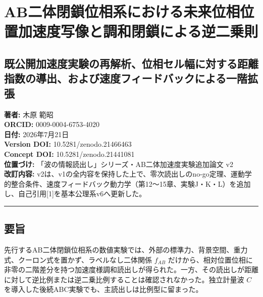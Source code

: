\documentclass[
  a4paper,
]{ltjsarticle}
\author{}
\date{}
\begin{document}
\section{AB二体閉鎖位相系における未来位相位置加速度写像と調和閉鎖による逆二乗則}\label{abux4e8cux4f53ux9589ux9396ux4f4dux76f8ux7cfbux306bux304aux3051ux308bux672aux6765ux4f4dux76f8ux4f4dux7f6eux52a0ux901fux5ea6ux5199ux50cfux3068ux8abfux548cux9589ux9396ux306bux3088ux308bux9006ux4e8cux4e57ux5247}

\subsection{既公開加速度実験の再解析、位相セル幅に対する距離指数の導出、および速度フィードバックによる一階拡張}\label{ux65e2ux516cux958bux52a0ux901fux5ea6ux5b9fux9a13ux306eux518dux89e3ux6790ux4f4dux76f8ux30bbux30ebux5e45ux306bux5bfeux3059ux308bux8dddux96e2ux6307ux6570ux306eux5c0eux51faux304aux3088ux3073ux901fux5ea6ux30d5ux30a3ux30fcux30c9ux30d0ux30c3ux30afux306bux3088ux308bux4e00ux968eux62e1ux5f35}

\textbf{著者:} 木原 範昭\\
\textbf{ORCID:} 0009-0004-6753-4020\\
\textbf{日付:} 2026年7月21日\\
\textbf{Version DOI:} 10.5281/zenodo.21466463\\
\textbf{Concept DOI:} 10.5281/zenodo.21441081\\
\textbf{位置づけ:} 「波の情報読出し」シリーズ・AB二体加速度実験追加論文
v2\\
\textbf{改訂内容:}
v2は、v1の全内容を保持した上で、零次読出しのno-go定理、運動学的整合条件、速度フィードバック動力学（第12〜15章、実験J・K・L）を追加し、自己引用{[}1{]}を基本公理系v6へ更新した。

\begin{center}\rule{0.5\linewidth}{0.5pt}\end{center}

\subsection{要旨}\label{ux8981ux65e8}

先行するAB二体閉鎖位相系の数値実験では、外部の標準力、背景空間、重力式、クーロン式を置かず、ラベルなし二体関係
\(f_{AB}\)
だけから、相対位置位相に非零の二階差分を持つ加速度様調和読出しが得られた。一方、その読出しが距離に対して逆比例または逆二乗比例することは確認されなかった。独立計量波
\(C\) を導入した後続ABC実験でも、主読出しは比例型に留まった。
\end{document}
